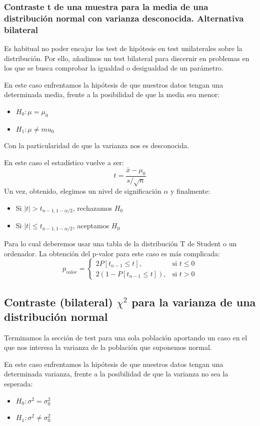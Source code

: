 \documentclass[a4paper,12pt]{article}
\begin{document}
\subsubsection{Contraste t de una muestra para la media de una distribución normal con varianza desconocida. Alternativa bilateral}
Es habitual no poder encajar los test de hipótesis en test unilaterales sobre la distribución. Por ello, añadimos un test bilateral para discernir en problemas en los que se busca comprobar la igualdad o desigualdad de un parámetro.

En este caso enfrentamos la hipótesis de que nuestros datos tengan una determinada media, frente a la posibilidad  de que la media sea menor: 
\begin{itemize}
	\item $H_0:\mu=\mu_0$
	\item $H_1: \mu\neq mu_0$
\end{itemize}
Con la particularidad de que la varianza nos es desconocida.

En este caso el estadístico vuelve a ser: 
$$t=\frac{\bar{x}-\mu_0}{s/\sqrt{n}}$$
Un vez, obtenido, elegimos un nivel de significación $\alpha$ y finalmente:
\begin{itemize}
	\item Si $|t|>t_{n-1,1-\alpha/2}$, rechazamos $H_0$
	\item Si $|t|\leq t_{n-1,1-\alpha/2}$, aceptamos $H_0$
\end{itemize}
Para lo cual deberemos usar una tabla de la distribución T de Student o un ordenador.
La obtención del p-valor para este caso es más complicada:
$$p_{valor} = \begin{cases} 2P[t_{n-1}\leq t], & \mbox{si } t\leq 0 \\ 2(1-P[t_{n-1}\leq t]), & \mbox{si } t>0 \end{cases}$$

\subsection{Contraste (bilateral) $\chi^2$ para la varianza de una distribución normal}

Terminamos la sección de test para una sola población aportando un caso en el que nos interesa la varianza de la población que suponemos normal.

En este caso enfrentamos la hipótesis de que nuestros datos tengan una determinada varianza, frente a la posibilidad  de que la varianza no sea la esperada: 
\begin{itemize}
	\item $H_0:\sigma^2=\sigma^2_0$
	\item $H_1: \sigma^2\neq\sigma^2_0$
\end{itemize}
\end{document}
